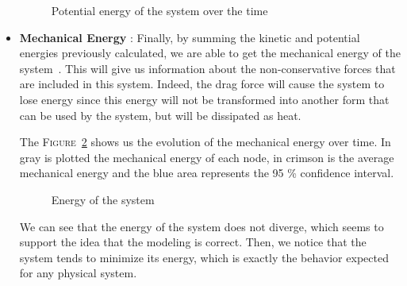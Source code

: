 \begin{itemize}
    \begin{figure}[!htb]
        \centering
        
        \caption{Potential energy of the system over the time}
        \label{fig:potential_energy}
    \end{figure}

    \item \textbf{Mechanical Energy} : Finally, by summing the kinetic and potential energies previously calculated, we are able to get the mechanical energy of the system~\cite{viegas_kinetic_2004}. This will give us information about the non-conservative forces that are included in this system. Indeed, the drag force will cause the system to lose energy since this energy will not be transformed into another form that can be used by the system, but will be dissipated as heat.

    The \textsc{Figure}~\ref{fig:energy} shows us the evolution of the mechanical energy over time. In gray is plotted the mechanical energy of each node, in crimson is the average mechanical energy and the blue area represents the 95 \% confidence interval.
    
    \begin{figure}[!htb]
        \centering
        
        \caption{Energy of the system}
        \label{fig:energy}
    \end{figure}

    We can see that the energy of the system does not diverge, which seems to support the idea that the modeling is correct. Then, we notice that the system tends to minimize its energy, which is exactly the behavior expected for any physical system.
\end{itemize}
